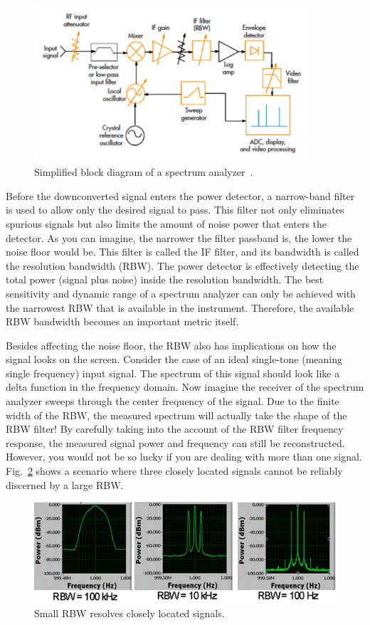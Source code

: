 \documentclass[letterpaper, 11pt]{article}
\begin{document}
\begin{figure}[h]
	\centering
	\includegraphics[width=4in]{sa-blocks}
	\caption{Simplified block diagram of a spectrum analyzer~\cite{diez-sa}.}
	\label{fig:sa-blocks}
\end{figure}

Before the downconverted signal enters the power detector, a narrow-band filter is used to allow only the desired signal to pass. This filter not only eliminates spurious signals but also limits the amount of noise power that enters the detector. As you can imagine, the narrower the filter passband is, the lower the noise floor would be. This filter is called the IF filter, and its bandwidth is called the resolution bandwidth (RBW). The power detector is effectively detecting the total power (signal plus noise) inside the resolution bandwidth. The best sensitivity and dynamic range of a spectrum analyzer can only be achieved with the narrowest RBW that is available in the instrument. Therefore, the available RBW bandwidth becomes an important metric itself. 

Besides affecting the noise floor, the RBW also has implications on how the signal looks on the screen. Consider the case of an ideal single-tone (meaning single frequency) input signal. The spectrum of this signal should look like a delta function in the frequency domain. Now imagine the receiver of the spectrum analyzer sweeps through the center frequency of the signal. Due to the finite width of the RBW, the measured spectrum will actually take the shape of the RBW filter! By carefully taking into the account of the RBW filter frequency response, the measured signal power and frequency can still be reconstructed. However, you would not be so lucky if you are dealing with more than one signal. Fig.~\ref{fig:sa-rbw} shows a scenario where three closely located signals cannot be reliably discerned by a large RBW. 

\begin{figure}[h]
	\centering
	\includegraphics[width=4.5in]{sa-rbw}
	\caption{Small RBW resolves closely located signals.}
	\label{fig:sa-rbw}
\end{figure}
\end{document}
